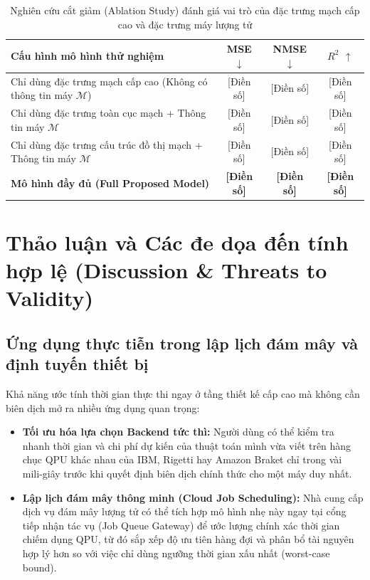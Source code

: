 \documentclass[11pt, a4paper]{article}
\begin{document}
\begin{table}[htbp]
\centering
\caption{Nghiên cứu cắt giảm (Ablation Study) đánh giá vai trò của đặc trưng mạch cấp cao và đặc trưng máy lượng tử}
\label{tab:rq3_ablation}
\begin{tabularx}{\textwidth}{X c c c}
\toprule
\textbf{Cấu hình mô hình thử nghiệm} & \textbf{MSE $\downarrow$} & \textbf{NMSE $\downarrow$} & \textbf{$R^2$ $\uparrow$} \\
\midrule
Chỉ dùng đặc trưng mạch cấp cao (Không có thông tin máy $\mathcal{M}$) & [Điền số] & [Điền số] & [Điền số] \\
Chỉ dùng đặc trưng toàn cục mạch + Thông tin máy $\mathcal{M}$ & [Điền số] & [Điền số] & [Điền số] \\
Chỉ dùng đặc trưng cấu trúc đồ thị mạch + Thông tin máy $\mathcal{M}$ & [Điền số] & [Điền số] & [Điền số] \\
\textbf{Mô hình đầy đủ (Full Proposed Model)} & \textbf{[Điền số]} & \textbf{[Điền số]} & \textbf{[Điền số]} \\
\bottomrule
\end{tabularx}
\end{table}

\section{Thảo luận và Các đe dọa đến tính hợp lệ (Discussion \& Threats to Validity)}

\subsection{Ứng dụng thực tiễn trong lập lịch đám mây và định tuyến thiết bị}
Khả năng ước tính thời gian thực thi ngay ở tầng thiết kế cấp cao mà không cần biên dịch mở ra nhiều ứng dụng quan trọng:
\begin{itemize}
    \item \textbf{Tối ưu hóa lựa chọn Backend tức thì:} Người dùng có thể kiểm tra nhanh thời gian và chi phí dự kiến của thuật toán mình vừa viết trên hàng chục QPU khác nhau của IBM, Rigetti hay Amazon Braket chỉ trong vài mili-giây trước khi quyết định biên dịch chính thức cho một máy duy nhất.
    \item \textbf{Lập lịch đám mây thông minh (Cloud Job Scheduling):} Nhà cung cấp dịch vụ đám mây lượng tử có thể tích hợp mô hình nhẹ này ngay tại cổng tiếp nhận tác vụ (Job Queue Gateway) để ước lượng chính xác thời gian chiếm dụng QPU, từ đó sắp xếp độ ưu tiên hàng đợi và phân bổ tài nguyên hợp lý hơn so với việc chỉ dùng ngưỡng thời gian xấu nhất (worst-case bound).
\end{itemize}
\end{document}
